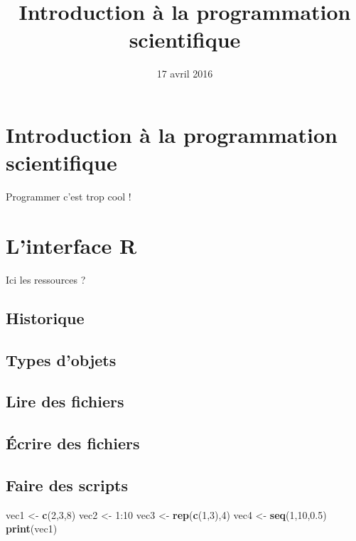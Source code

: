 \documentclass[french,]{article}
\title{Introduction à la programmation scientifique}
\author{}
\date{17 avril 2016}
\newenvironment{Shaded}{\begin{snugshade}}{\end{snugshade}}
\newcommand{\KeywordTok}[1]{\textcolor[rgb]{0.13,0.29,0.53}{\textbf{{#1}}}}
\newcommand{\DecValTok}[1]{\textcolor[rgb]{0.00,0.00,0.81}{{#1}}}
\newcommand{\FloatTok}[1]{\textcolor[rgb]{0.00,0.00,0.81}{{#1}}}
\newcommand{\StringTok}[1]{\textcolor[rgb]{0.31,0.60,0.02}{{#1}}}
\newcommand{\NormalTok}[1]{{#1}}
\begin{document}
\maketitle

{
\setcounter{tocdepth}{3}
\tableofcontents
}
\newpage

\section{Introduction à la programmation
scientifique}\label{introduction-a-la-programmation-scientifique}

Programmer c'est trop cool !

\newpage

\section{L'interface R}\label{linterface-r}

Ici les ressources ?

\subsection{Historique}\label{historique}

\subsection{Types d'objets}\label{types-dobjets}

\subsection{Lire des fichiers}\label{lire-des-fichiers}

\subsection{Écrire des fichiers}\label{ecrire-des-fichiers}

\subsection{Faire des scripts}\label{faire-des-scripts}

\begin{Shaded}
\begin{Highlighting}[]
\NormalTok{vec1 <-}\StringTok{ }\KeywordTok{c}\NormalTok{(}\DecValTok{2}\NormalTok{,}\DecValTok{3}\NormalTok{,}\DecValTok{8}\NormalTok{)}
\NormalTok{vec2 <-}\StringTok{ }\DecValTok{1}\NormalTok{:}\DecValTok{10}
\NormalTok{vec3 <-}\StringTok{ }\KeywordTok{rep}\NormalTok{(}\KeywordTok{c}\NormalTok{(}\DecValTok{1}\NormalTok{,}\DecValTok{3}\NormalTok{),}\DecValTok{4}\NormalTok{)}
\NormalTok{vec4 <-}\StringTok{ }\KeywordTok{seq}\NormalTok{(}\DecValTok{1}\NormalTok{,}\DecValTok{10}\NormalTok{,}\FloatTok{0.5}\NormalTok{)}
\KeywordTok{print}\NormalTok{(vec1)}
\end{Highlighting}
\end{Shaded}
\end{document}
